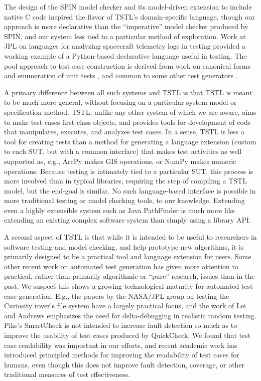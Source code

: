 The design of the SPIN model checker \cite{SPIN} and its model-driven
extension to include native C code \cite{ModelDriven} inspired the
flavor of TSTL's domain-specific language, though our approach is more
declarative than the ``imperative'' model checker produced by SPIN,
and our system less tied to a particular method of exploration.
Work at JPL on languages for analyzing spacecraft telemetry
logs in testing \cite{scriptstospecs} provided a working example of a
Python-based declarative language useful in testing.  The pool
approach to test case construction is derived from work on canonical
forms and enumeration of unit tests \cite{AndrewsTR}, and common to
some other test generators \cite{Pacheco}.

A primary difference between all such systems and TSTL is that TSTL is
meant to be much more general, without focusing on a particular system
model or specification method.  
TSTL, unlike any other system of which we are
aware, aims to make test cases first-class objects, and provides tools
for development of code that manipulates, executes, and analyzes test
cases.  In a sense, TSTL is less a tool for creating tests than a
method for generating a language extension (custom to each SUT, but
with a common interface) that makes test activities as well supported
as, e.g., ArcPy makes GIS operations, or NumPy makes numeric
operations.  Because testing is intimately tied to a particular SUT,
this process is more involved than in typical libraries, requiring the
step of compiling a TSTL model, but the end-goal is similar.  No such
language-based interface is possible in more traditional testing or
model checking tools, to our knowledge.  Extending even a highly
extensible system such as Java PathFinder \cite{JPF2} is much more
like extending an existing complex software system than simply using a
library API. 

A second aspect of TSTL is that while it is intended to be useful to
researchers in software testing and model checking, and help prototype
new algorithms, it is primarily designed to be a practical tool and
language extension for
users.
Some other recent work on automated test generation has given more attention
to practical, rather than primarily algorithmic or ``pure'' research, issues than in the
past.  We suspect this shows a growing technological maturity for
automated test case generation.  E.g., the papers by the NASA/JPL
group on testing the Curiosity rover's file system
\cite{ICSEDiff,CFV08,AMAI} have a largely practical focus, and the
work of Lei and Andrews \cite{MinUnit} emphasizes the need for
delta-debugging in realistic random testing.  Pike's SmartCheck
\cite{SmartCheck} is not intended to increase fault detection so much
as to improve the usability of test cases produced by QuickCheck. We found that test case
readability was important in our efforts, and recent academic work
\cite{Readable,Guava} has introduced principled methods for improving
the readability of test cases for humans, even though this does not
improve fault detection, coverage, or other traditional measures of
test effectiveness.


